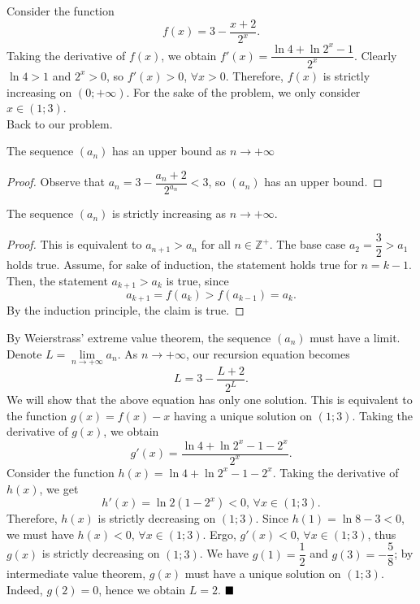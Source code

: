 \documentclass[11pt]{article}
\newenvironment{solution}[1][Solution]{%
  \proof[\normalfont \faPenNib \hspace{0.2cm} \ttfamily \scshape \large #1]%
}{\(\hfill \blacksquare\){\parfillskip0pt\par}}
\theoremstyle{definition}
\begin{document}
        \begin{solution}
            Consider the function
            \[f(x) = 3 - \frac{x + 2}{2^x}.\]
            Taking the derivative of \(f(x)\), we obtain \(f'(x) = \dfrac{\ln 4 + \ln 2^x - 1}{2^x}\). Clearly \(\ln 4 > 1\) and \(2^x > 0\), so \(f'(x) > 0\), \(\forall x > 0\). Therefore, \(f(x)\) is strictly increasing on \((0;+\infty)\). For the sake of the problem, we only consider \(x \in (1;3)\).\\
            Back to our problem.
            
            \begin{claim}
                The sequence \((a_n)\) has an upper bound as \(n \to +\infty\)
            \end{claim}
            
            \begin{proof}
                Observe that \(a_n = 3 - \dfrac{a_n + 2}{2^{a_n}} < 3\), so \((a_n)\) has an upper bound.
            \end{proof}

            \begin{claim}
                The sequence \((a_n)\) is strictly increasing as \(n \to +\infty\).
            \end{claim}

            \begin{proof}
                This is equivalent to \(a_{n+1} > a_n\) for all \(n \in \mathbb{Z}^+\). The base case \(a_2 = \dfrac{3}{2} > a_1\) holds true. Assume, for sake of induction, the statement holds true for \(n = k - 1\). Then, the statement \(a_{k+1} > a_k\) is true, since
                \[a_{k+1} = f(a_k) > f(a_{k-1}) = a_k.\]
                By the induction principle, the claim is true.
            \end{proof}

            By Weierstrass' extreme value theorem, the sequence \((a_n)\) must have a limit. Denote \(L = \lim\limits_{n \to +\infty} a_n\). As \(n \to +\infty\), our recursion equation becomes
            \[L = 3 - \frac{L + 2}{2^L}.\]
            We will show that the above equation has only one solution. This is equivalent to the function \(g(x) = f(x) - x\) having a unique solution on \((1;3)\). Taking the derivative of \(g(x)\), we obtain
            \[g'(x) = \frac{\ln 4 + \ln 2^x - 1 - 2^x}{2^x}.\]
            Consider the function \(h(x) = \ln 4 + \ln 2^x - 1 - 2^x\). Taking the derivative of \(h(x)\), we get
            \[h'(x) = \ln 2 (1 - 2^x) < 0 \text{, } \forall x \in (1;3).\]
            Therefore, \(h(x)\) is strictly decreasing on \((1;3)\). Since \(h(1) = \ln 8 - 3 < 0\), we must have \(h(x) < 0\), \(\forall x \in (1;3)\). Ergo, \(g'(x) < 0\), \(\forall x \in (1;3)\), thus \(g(x)\) is strictly decreasing on \((1;3)\). We have \(g(1) = \dfrac{1}{2}\) and \(g(3) = -\dfrac{5}{8}\); by intermediate value theorem, \(g(x)\) must have a unique solution on \((1;3)\). Indeed, \(g(2) = 0\), hence we obtain \(L = 2\).
        \end{solution}
\end{document}
